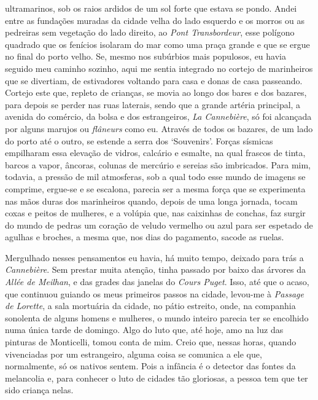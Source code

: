 ultramarinos, sob os raios ardidos de um sol forte que estava se pondo.
Andei entre as fundações muradas da cidade velha do lado esquerdo e os
morros ou as pedreiras sem vegetação do lado direito, ao \emph{Pont
Transbordeur}, esse polígono quadrado que os fenícios isolaram do mar
como uma praça grande e que se ergue no final do porto velho. Se, mesmo
nos subúrbios mais populosos, eu havia seguido meu caminho sozinho, aqui
me sentia integrado no cortejo de marinheiros que se divertiam, de
estivadores voltando para casa e donas de casa passeando. Cortejo este
que, repleto de crianças, se movia ao longo dos bares e dos bazares,
para depois se perder nas ruas laterais, sendo que a grande artéria
principal, a avenida do comércio, da bolsa e dos estrangeiros, \emph{La
Cannebière}, só foi alcançada por alguns marujos ou \emph{flâneurs} como
eu. Através de todos os bazares, de um lado do porto até o outro, se
estende a serra dos `Souvenirs'. Forças sísmicas empilharam essa
elevação de vidros, calcário e esmalte, na qual frascos de tinta, barcos
a vapor, âncoras, colunas de mercúrio e sereias são imbricados. Para
mim, todavia, a pressão de mil atmosferas, sob a qual todo esse mundo de
imagens se comprime, ergue-se e se escalona, parecia ser a mesma força
que se experimenta nas mãos duras dos marinheiros quando, depois de uma
longa jornada, tocam coxas e peitos de mulheres, e a volúpia que, nas
caixinhas de conchas, faz surgir do mundo de pedras um coração de veludo
vermelho ou azul para ser espetado de agulhas e broches, a mesma que,
nos dias do pagamento, sacode as ruelas.

Mergulhado nesses pensamentos eu havia, há muito tempo, deixado para
trás a \emph{Cannebière}. Sem prestar muita atenção, tinha passado por
baixo das árvores da \emph{Allée de Meilhan}, e das grades das janelas
do \emph{Cours Puget}. Isso, até que o acaso, que continuou guiando os
meus primeiros passos na cidade, levou-me à \emph{Passage de Lorette}, a
sala mortuária da cidade, no pátio estreito, onde, na companhia
sonolenta de alguns homens e mulheres, o mundo inteiro parecia ter se
encolhido numa única tarde de domingo. Algo do luto que, até hoje, amo
na luz das pinturas de Monticelli, tomou conta de mim. Creio que, nessas
horas, quando vivenciadas por um estrangeiro, alguma coisa se comunica a
ele que, normalmente, só os nativos sentem. Pois a infância é o detector
das fontes da melancolia e, para conhecer o luto de cidades tão
gloriosas, a pessoa tem que ter sido criança nelas.

